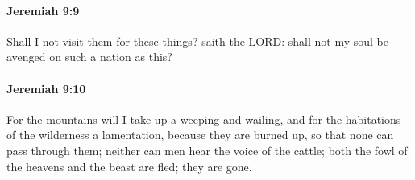 		\paragraph{Jeremiah 9:9} %
			\label{JEREMIAH-9-9}

			Shall I not visit them for these things? saith the LORD: shall not my soul be avenged on such a nation as this?


		\paragraph{Jeremiah 9:10} %
			\label{JEREMIAH-9-10}

			For the mountains will I take up a weeping and wailing, and for the habitations of the wilderness a lamentation, because they are burned up, so that none can pass through them; neither can men hear the voice of the cattle; both the fowl of the heavens and the beast are fled; they are gone.

